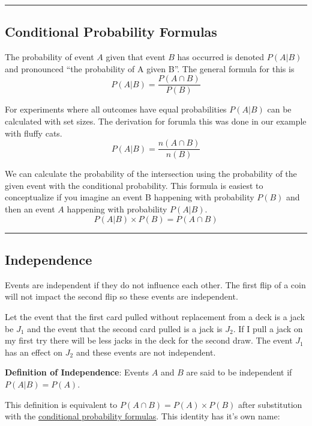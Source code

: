 \documentclass[
]{book}
\begin{document}
\begin{center}\rule{0.5\linewidth}{0.5pt}\end{center}

\hypertarget{condprob}{%
\subsection{Conditional Probability Formulas}\label{condprob}}

The probability of event \(A\) given that event \(B\) has occurred is denoted \(P(A|B)\) and pronounced ``the probability of A given B''.
The general formula for this is \[P(A|B)=\frac{P(A \cap B)}{P(B)}\]

For experiments where all outcomes have equal probabilities \(P(A|B)\) can be calculated with set sizes. The derivation for forumla this was done in our example with fluffy cats. \[P(A|B)=\frac{n(A \cap B)}{n(B)}\]

We can calculate the probability of the intersection using the probability of the given event with the conditional probability. This formula is easiest to conceptualize if you imagine an event B happening with probability \(P(B)\) and then an event \(A\) happening with probability \(P(A|B)\). \[P(A|B) \times P(B) = P(A \cap B)\]

\begin{center}\rule{0.5\linewidth}{0.5pt}\end{center}

\hypertarget{independence}{%
\subsection{Independence}\label{independence}}

Events are independent if they do not influence each other. The first flip of a coin will not impact the second flip so these events are independent.

Let the event that the first card pulled without replacement from a deck is a jack be \(J_1\) and the event that the second card pulled is a jack is \(J_2\). If I pull a jack on my first try there will be less jacks in the deck for the second draw. The event \(J_1\) has an effect on \(J_2\) and these events are not independent.

\textbf{Definition of Independence}: Events \(A\) and \(B\) are said to be independent if \(P(A|B)=P(A)\).

This definition is equivalent to \(P(A \cap B) = P(A) \times P(B)\) after substitution with the \protect\hyperlink{condprob}{conditional probability formulas}. This identity has it's own name:
\end{document}
